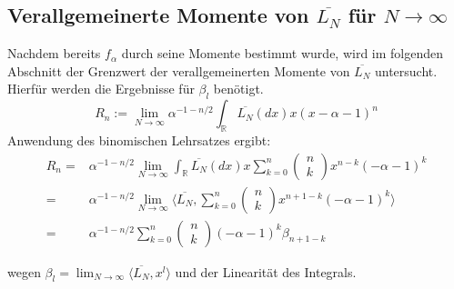\documentclass[a4paper, 11pt]{scrreprt}
\newcommand{\RR}{\mathbb{R}}
\begin{document}
\subsection*{Verallgemeinerte Momente von $ \overline{L_N} $ für $ N \to \infty $}
Nachdem bereits $ f_\alpha $ durch seine Momente bestimmt wurde, wird im folgenden Abschnitt der Grenzwert der verallgemeinerten Momente von $ \overline{L_N} $ untersucht. Hierfür werden die Ergebnisse für $ \beta_l $ benötigt.\\
\begin{equation}
R_n:=\lim_{N \to \infty} \alpha^{-1-n/2} \int_{\RR}\overline{L_{N}}(dx)x(x-\alpha-1)^{n} 
\end{equation}
Anwendung des binomischen Lehrsatzes ergibt:
\begin{equation}
 \begin{split}
 R_n =& \alpha^{-1-n/2} \lim_{N \to \infty} \int_{\RR}\overline{L_{N}}(dx)x \sum_{k=0}^n \begin{pmatrix} n\\k\end{pmatrix} x^{n-k}(-\alpha -1)^k \\
 =& \alpha^{-1-n/2} \lim_{N \to \infty} \langle \overline{L_{N}}, \sum_{k=0}^n \begin{pmatrix} n\\k\end{pmatrix} x^{n+1-k}(-\alpha -1)^k \rangle \\
 =& \alpha^{-1-n/2}\sum_{k=0}^n \begin{pmatrix} n\\k\end{pmatrix} (-\alpha -1)^k \beta_{n+1-k}
 \end{split}
\end{equation}

wegen $\beta_l = \lim_{N\to\infty} \langle \overline{L_N}, x^l \rangle$ und der Linearität des Integrals.\\
\end{document}
